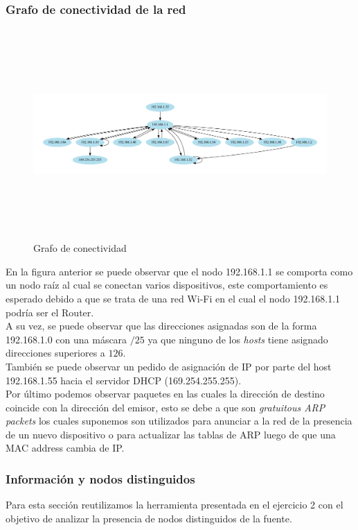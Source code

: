 \subsubsection{Grafo de conectividad de la red}


\begin{figure}[H]
   \centering
       \includegraphics[page=1,height=8cm ,width=1.08\textwidth]{../img/red-Empresa}
 \caption{Grafo de conectividad}
 \label{fig:Test}
\end{figure}


 En la figura anterior se puede observar que el nodo 192.168.1.1 se comporta como un nodo raíz al cual se conectan varios dispositivos, este comportamiento es esperado debido a que se trata de una red Wi-Fi en el cual el nodo 192.168.1.1 podría ser el Router. \\

A su vez, se puede observar que las direcciones asignadas son de la forma 192.168.1.0 con una máscara $/25$ ya que ninguno de los \emph{hosts} tiene asignado direcciones superiores a $126$. \\

También se puede observar un pedido de asignación de IP por parte del host 192.168.1.55 hacia el servidor DHCP (169.254.255.255).\\

Por último podemos observar paquetes en las cuales la dirección de destino coincide con la dirección del emisor, esto se debe a que son \emph{gratuitous ARP packets} los cuales suponemos son utilizados para anunciar a la red de la presencia de un nuevo dispositivo o para actualizar las tablas de ARP luego de que una MAC address cambia de IP.


 \subsubsection{Información y nodos distinguidos}
 Para esta sección reutilizamos la herramienta presentada en el ejercicio 2 con el objetivo de analizar la presencia de nodos distinguidos de la fuente. \\

